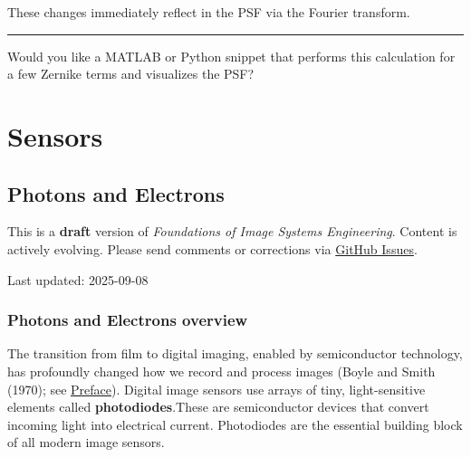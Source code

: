 \documentclass[
  letterpaper,
]{book}
\begin{document}
These changes immediately reflect in the PSF via the Fourier transform.

\begin{center}\rule{0.5\linewidth}{0.5pt}\end{center}

Would you like a MATLAB or Python snippet that performs this calculation
for a few Zernike terms and visualizes the PSF?

\part{Sensors}

\chapter{Photons and Electrons}\label{sec-sensors-photons-electrons}

\begin{tcolorbox}[enhanced jigsaw, colframe=quarto-callout-warning-color-frame, titlerule=0mm, rightrule=.15mm, opacitybacktitle=0.6, colback=white, leftrule=.75mm, coltitle=black, title=\textcolor{quarto-callout-warning-color}{\faExclamationTriangle}\hspace{0.5em}{Work in Progress}, bottomrule=.15mm, colbacktitle=quarto-callout-warning-color!10!white, breakable, left=2mm, bottomtitle=1mm, toptitle=1mm, opacityback=0, arc=.35mm, toprule=.15mm]

This is a \textbf{draft} version of \emph{Foundations of Image Systems
Engineering}. Content is actively evolving. Please send comments or
corrections via \href{https://github.com/wandell/FISE-git/issues}{GitHub
Issues}.

Last updated: 2025-09-08

\end{tcolorbox}

\section{Photons and Electrons
overview}\label{sec-sensors-photons-electrons-overview}

The transition from film to digital imaging, enabled by semiconductor
technology, has profoundly changed how we record and process images
(Boyle and Smith (1970); see \hyperref[sec-preface]{Preface}). Digital
image sensors use arrays of tiny, light-sensitive elements called
\textbf{photodiodes}.These are semiconductor devices that convert
incoming light into electrical current. Photodiodes are the essential
building block of all modern image sensors.
\end{document}

